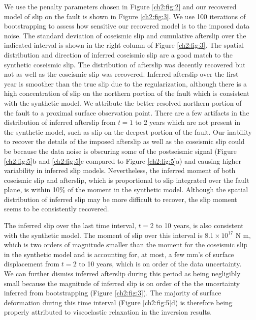 We use the penalty parameters chosen in Figure \ref{ch2:fig:2} and our
recovered model of slip on the fault is shown in Figure
\ref{ch2:fig:3}.  We use 100 iterations of bootstrapping to assess how
sensitive our recovered model is to the imposed data noise.  The
standard deviation of coseismic slip and cumulative afterslip over the
indicated interval is shown in the right column of Figure
\ref{ch2:fig:3}.  The spatial distribution and direction of inferred
coseismic slip are a good match to the synthetic coseismic slip.  The
distribution of afterslip was decently recovered but not as well as
the coseismic slip was recovered. Inferred afterslip over the first
year is smoother than the true slip due to the regularization,
although there is a high concentration of slip on the northern portion
of the fault which is consistent with the synthetic model.  We
attribute the better resolved northern portion of the fault to a
proximal surface observation point.  There are a few artifacts in the
distribution of inferred afterslip from $t=1$ to 2 years which are not
present in the synthetic model, such as slip on the deepest portion of
the fault. Our inability to recover the details of the imposed
afterslip as well as the coseismic slip could be because the data
noise is obscuring some of the postseismic signal (Figure
\ref{ch2:fig:5}b and \ref{ch2:fig:5}c compared to Figure
\ref{ch2:fig:5}a) and causing higher variability in inferred slip
models. Nevertheless, the inferred moment of both coseismic slip and
afterslip, which is proportional to slip integrated over the fault
plane, is within 10\% of the moment in the synthetic model.  Although
the spatial distribution of inferred slip may be more difficult to
recover, the slip moment seems to be consistently recovered.

The inferred slip over the last time interval, $t=2$ to 10 years, is
also consistent with the synthetic model.  The moment of slip over
this interval is $8.1\times 10^{17}$ N m, which is two orders of
magnitude smaller than the moment for the coseismic slip in the
synthetic model and is accounting for, at most, a few mm's of surface
displacement from $t=2$ to 10 years, which is on order of the data
uncertainty. We can further dismiss inferred afterslip during this
period as being negligibly small because the magnitude of inferred
slip is on order of the the uncertainty inferred from bootstrapping
(Figure \ref{ch2:fig:3}).  The majority of surface deformation during
this time interval (Figure \ref{ch2:fig:5}d) is therefore being
properly attributed to viscoelastic relaxation in the inversion
results.


